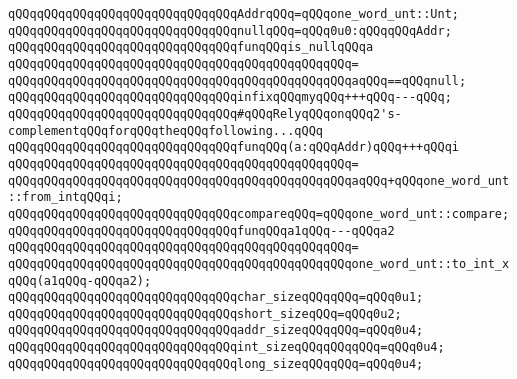 \verb|qQQqqQQqqQQqqQQqqQQqqQQqqQQqqQQqAddrqQQq=qQQqone_word_unt::Unt;|\newline
\newline
\verb|qQQqqQQqqQQqqQQqqQQqqQQqqQQqqQQqnullqQQq=qQQq0u0:qQQqqQQqAddr;|\newline
\newline
\verb|qQQqqQQqqQQqqQQqqQQqqQQqqQQqqQQqfunqQQqis_nullqQQqa|\newline
\verb|qQQqqQQqqQQqqQQqqQQqqQQqqQQqqQQqqQQqqQQqqQQqqQQq=|\newline
\verb|qQQqqQQqqQQqqQQqqQQqqQQqqQQqqQQqqQQqqQQqqQQqqQQqaqQQq==qQQqnull;|\newline
\newline
\newline
\verb|qQQqqQQqqQQqqQQqqQQqqQQqqQQqqQQqinfixqQQqmyqQQq+++qQQq---qQQq;|\newline
\newline
\verb|qQQqqQQqqQQqqQQqqQQqqQQqqQQqqQQq#qQQqRelyqQQqonqQQq2's-complementqQQqforqQQqtheqQQqfollowing...qQQq|\newline
\verb|qQQqqQQqqQQqqQQqqQQqqQQqqQQqqQQqfunqQQq(a:qQQqAddr)qQQq+++qQQqi|\newline
\verb|qQQqqQQqqQQqqQQqqQQqqQQqqQQqqQQqqQQqqQQqqQQqqQQq=|\newline
\verb|qQQqqQQqqQQqqQQqqQQqqQQqqQQqqQQqqQQqqQQqqQQqqQQqaqQQq+qQQqone_word_unt::from_intqQQqi;|\newline
\newline
\verb|qQQqqQQqqQQqqQQqqQQqqQQqqQQqqQQqcompareqQQq=qQQqone_word_unt::compare;|\newline
\newline
\verb|qQQqqQQqqQQqqQQqqQQqqQQqqQQqqQQqfunqQQqa1qQQq---qQQqa2|\newline
\verb|qQQqqQQqqQQqqQQqqQQqqQQqqQQqqQQqqQQqqQQqqQQqqQQq=|\newline
\verb|qQQqqQQqqQQqqQQqqQQqqQQqqQQqqQQqqQQqqQQqqQQqqQQqone_word_unt::to_int_xqQQq(a1qQQq-qQQqa2);|\newline
\newline
\verb|qQQqqQQqqQQqqQQqqQQqqQQqqQQqqQQqchar_sizeqQQqqQQq=qQQq0u1;|\newline
\verb|qQQqqQQqqQQqqQQqqQQqqQQqqQQqqQQqshort_sizeqQQq=qQQq0u2;|\newline
\newline
\verb|qQQqqQQqqQQqqQQqqQQqqQQqqQQqqQQqaddr_sizeqQQqqQQq=qQQq0u4;|\newline
\verb|qQQqqQQqqQQqqQQqqQQqqQQqqQQqqQQqint_sizeqQQqqQQqqQQq=qQQq0u4;|\newline
\verb|qQQqqQQqqQQqqQQqqQQqqQQqqQQqqQQqlong_sizeqQQqqQQq=qQQq0u4;|\newline

